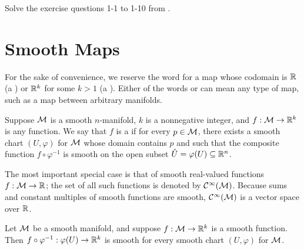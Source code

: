 \documentclass[11pt,a4paper]{article}
\begin{document}
Solve the exercise questions 1-1 to 1-10 from \cite[Ch 1]{JohnLee}.

\section{Smooth Maps}

\begin{remark}
For the sake of convenience, we reserve the word  for a map whose codomain is $\mathbb{R}$ (a ) or $\mathbb{R}^k$ for some $k>1$ (a ). Either of the words  or  can mean any type of map, such as a map between arbitrary manifolds.
\end{remark}

\begin{definition}\label{def:smooth_function}
Suppose $\mathcal{M}$ is a smooth $n$-manifold, $k$ is a nonnegative integer, and $f:\mathcal{M}\rightarrow \mathbb{R}^k$ is any function. We say that $f$ is a  if for every $p\in\mathcal{M}$, there exists a smooth chart $(U,\varphi)$ for $\mathcal{M}$ whose domain contains $p$ and such that the composite function $f\circ\varphi^{-1}$ is smooth on the open subset $\hat{U} = \varphi(U)\subseteq\mathbb{R}^n$.
\end{definition}

\begin{remark}
The most important special case is that of smooth real-valued functions $f:\mathcal{M}\rightarrow \mathbb{R}$; the set of all such functions is denoted by $\mathcal{C}^\infty(\mathcal{M})$. Because sums and constant multiples of smooth functions are smooth, $\mathcal{C}^\infty(\mathcal{M})$ is a vector space over $\mathbb{R}$.
\end{remark}

\begin{proposition}\label{prop:smooth_coordinate_rep}
Let $\mathcal{M}$ be a smooth manifold, and suppose $f:\mathcal{M}\rightarrow \mathbb{R}^k$ is a smooth function. Then $f\circ\varphi^{-1}:\varphi(U)\rightarrow \mathbb{R}^k$ is smooth for every smooth chart $(U,\varphi)$ for $\mathcal{M}$.
\end{proposition}

\end{document}

